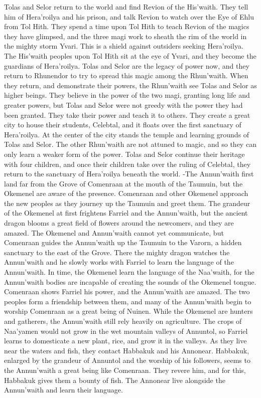 \documentclass[smalldemyvopaper,11pt,twoside,onecolumn,openright,extrafontsizes]{memoir}
\begin{document}
Tolas and Selor return to the world and find Revion of the His’waith. They tell him of Hera’roilya and his prison, and talk Revion to watch over the Eye of Ehlu from Tol Hith. They spend a time upon Tol Hith to teach Revion of the magics they have glimpsed, and the three magi work to sheath the rim of the world in the mighty storm Yvari. This is a shield against outsiders seeking Hera’roilya. The His’waith peoples upon Tol Hith sit at the eye of Yvari, and they become the guardians of Hera’roilya. Tolas and Selor are the legacy of power now, and they return to Rhunendor to try to spread this magic among the Rhun’waith. When they return, and demonstrate their powers, the Rhun’waith see Tolas and Selor as higher beings. They believe in the power of the two magi, granting long life and greater powers, but Tolas and Selor were not greedy with the power they had been granted. They take their power and teach it to others. They create a great city to house their students, Celebtal, and it floats over the first sanctuary of Hera’roilya. At the center of the city stands the temple and learning grounds of Tolas and Selor. The other Rhun’waith are not attuned to magic, and so they can only learn a weaker form of the power. Tolas and Selor continue their heritage with four children, and once their children take over the ruling of Celebtal, they return to the sanctuary of Hera’roilya beneath the world.
-The Annun’waith first land far from the Grove of Comenraan at the mouth of the Taumuin, but the Okemenel are aware of the presence. Comenraan and other Okemenel approach the new peoples as they journey up the Taumuin and greet them. The grandeur of the Okemenel at first frightens Farriel and the Annun’waith, but the ancient dragon blooms a great field of flowers around the newcomers, and they are amazed. The Okemenel and Annun’waith cannot yet communicate, but Comenraan guides the Annun’waith up the Taumuin to the Varorn, a hidden sanctuary to the east of the Grove. There the mighty dragon watches the Annun’waith and he slowly works with Farriel to learn the language of the Annun’waith. In time, the Okemenel learn the language of the Naa’waith, for the Annun’waith bodies are incapable of creating the sounds of the Okemenel tongue. Comenraan shows Farriel his power, and the Annun’waith are amazed. The two peoples form a friendship between them, and many of the Annun’waith begin to worship Comenraan as a great being of Nuinen. While the Okemenel are hunters and gatherers, the Annun’waith still rely heavily on agriculture. The crops of Naa’yamen would not grow in the wet mountain valleys of Annuntol, so Farriel learns to domesticate a new plant, rice, and grow it in the valleys. As they live near the waters and fish, they contact Habbakuk and his Annonear. Habbakuk, enlarged by the grandeur of Annuntol and the worship of his followers, seems to the Annun’waith a great being like Comenraan. They revere him, and for this, Habbakuk gives them a bounty of fish. The Annonear live alongside the Annun’waith and learn their language.
\end{document}
